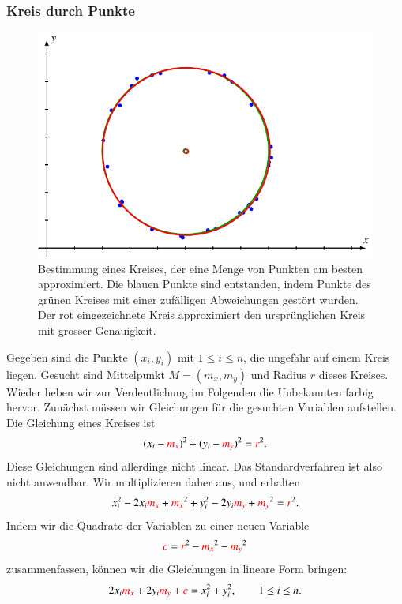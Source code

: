 \subsubsection{Kreis durch Punkte}
\begin{figure}
\centering
\includegraphics{4/images/kreis.pdf}
\caption{Bestimmung eines Kreises, der eine Menge von Punkten am besten
approximiert.
Die blauen Punkte sind entstanden, indem Punkte des grünen Kreises
mit einer zufälligen Abweichungen gestört wurden.
Der rot eingezeichnete Kreis approximiert den ursprünglichen
Kreis mit grosser Genauigkeit.
\label{skript:linreg-abb}}
\end{figure}
Gegeben sind die Punkte $(x_i,y_i)$ mit $1\le i\le n$, die ungefähr
auf einem Kreis liegen.
Gesucht sind Mittelpunkt $M=(m_x,m_y)$ und Radius $r$ dieses Kreises.
Wieder heben wir zur Verdeutlichung im Folgenden die Unbekannten farbig
hervor.
Zunächst müssen wir Gleichungen für die gesuchten Variablen aufstellen.
Die Gleichung eines Kreises ist
\[
(x_i - {\color{red}m_x})^2 + (y_i - {\color{red}m_y})^2 = {\color{red}r}^2.
\]
Diese Gleichungen sind allerdings nicht linear.
Das Standardverfahren ist also nicht anwendbar.
Wir multiplizieren daher aus, und erhalten
\[
x_i^2 - 2x_i {\color{red}m_x} + {\color{red}m_x}^2
+
y_i^2 - 2y_i {\color{red}m_y} + {\color{red}m_y}^2
=
{\color{red}r}^2.
\]
Indem wir die Quadrate der Variablen zu einer neuen Variable 
\[
{\color{red}c}
=
{\color{red}r}^2
-
{\color{red}m_x}^2
-
{\color{red}m_y}^2
\]
zusammenfassen, können wir die Gleichungen in lineare Form bringen:
\begin{equation}
2x_i{\color{red}m_x}
+
2y_i{\color{red}m_y}
+
{\color{red}c}
=
x_i^2+y_i^2,\qquad 1\le i\le n.
\end{equation}
